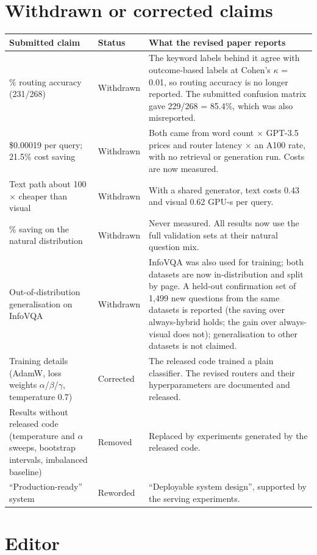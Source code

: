 \documentclass[11pt]{article}
\begin{document}
\section*{Withdrawn or corrected claims}
\begin{tabularx}{\textwidth}{>{\raggedright\arraybackslash}p{}l>{\raggedright\arraybackslash}X}
\toprule \textbf{Submitted claim} & \textbf{Status} & \textbf{What the revised paper reports} \\ \midrule
86.2\% routing accuracy (231/268) & Withdrawn & The keyword labels behind it agree with outcome-based labels at Cohen's $\kappa$ = 0.01, so routing accuracy is no longer reported. The submitted confusion matrix gave 229/268 = 85.4\%, which was also misreported. \\
\$0.00019 per query; 21.5\% cost saving & Withdrawn & Both came from word count $\times$ GPT-3.5 prices and router latency $\times$ an A100 rate, with no retrieval or generation run. Costs are now measured. \\
Text path about 100$\times$ cheaper than visual & Withdrawn & With a shared generator, text costs 0.43 and visual 0.62 GPU-s per query. \\
92.6\% saving on the natural distribution & Withdrawn & Never measured. All results now use the full validation sets at their natural question mix. \\
Out-of-distribution generalisation on InfoVQA & Withdrawn & InfoVQA was also used for training; both datasets are now in-distribution and split by page. A held-out confirmation set of 1,499 new questions from the same datasets is reported (the saving over always-hybrid holds; the gain over always-visual does not); generalisation to other datasets is not claimed. \\
Training details (AdamW, loss weights $\alpha$/$\beta$/$\gamma$, temperature 0.7) & Corrected & The released code trained a plain classifier. The revised routers and their hyperparameters are documented and released. \\
Results without released code (temperature and $\alpha$ sweeps, bootstrap intervals, imbalanced baseline) & Removed & Replaced by experiments generated by the released code. \\
``Production-ready'' system & Reworded & ``Deployable system design'', supported by the serving experiments. \\
\bottomrule\end{tabularx}

\section*{Editor}
\end{document}
